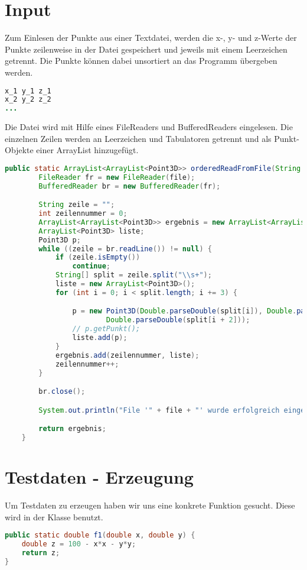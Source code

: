 \documentclass[11pt, bibliography=totocnumbered]{scrartcl}
\begin{document}
\section{Input}
Zum Einlesen der Punkte aus einer Textdatei, werden die x-, y- und z-Werte der Punkte zeilenweise in der Datei gespeichert und jeweils mit einem Leerzeichen getrennt. Die Punkte k\"onnen dabei unsortiert an das Programm \"ubergeben werden. 
\begin{lstlisting}[caption={Input-Datei}, label={lst:label}, language=Java] 
x_1 y_1 z_1
x_2 y_2 z_2
...
\end{lstlisting}
Die Datei wird mit Hilfe eines FileReaders und BufferedReaders eingelesen. Die einzelnen Zeilen werden an Leerzeichen und Tabulatoren getrennt und als Punkt-Objekte einer ArrayList hinzugef\"ugt.
\begin{lstlisting}[caption={Input-Quellcode}, label={lst:label}, language=Java]
public static ArrayList<ArrayList<Point3D>> orderedReadFromFile(String file) throws IOException {
		FileReader fr = new FileReader(file);
		BufferedReader br = new BufferedReader(fr);

		String zeile = "";
		int zeilennummer = 0;
		ArrayList<ArrayList<Point3D>> ergebnis = new ArrayList<ArrayList<Point3D>>();
		ArrayList<Point3D> liste;
		Point3D p;
		while ((zeile = br.readLine()) != null) {
			if (zeile.isEmpty())
				continue;
			String[] split = zeile.split("\\s+");
			liste = new ArrayList<Point3D>();
			for (int i = 0; i < split.length; i += 3) {

				p = new Point3D(Double.parseDouble(split[i]), Double.parseDouble(split[i + 1]),
						Double.parseDouble(split[i + 2]));
				// p.getPunkt();
				liste.add(p);
			}
			ergebnis.add(zeilennummer, liste);
			zeilennummer++;
		}

		br.close();

		System.out.println("File '" + file + "' wurde erfolgreich eingelesen.");

		return ergebnis;
	}
\end{lstlisting}
\section{Testdaten - Erzeugung}

Um Testdaten zu erzeugen haben wir uns eine konkrete Funktion gesucht. Diese wird in der Klasse \grqq benutzt. 

\begin{lstlisting}[caption={Funktion zur Testdaten-Erzeugung}, label={lst:label}, language=Java]
public static double f1(double x, double y) {
	double z = 100 - x*x - y*y;
	return z;
}
\end{lstlisting}
\end{document}
